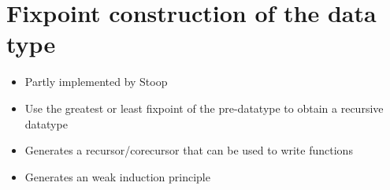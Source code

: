 \section{Fixpoint construction of the data type}

\begin{itemize}
\item{Partly implemented by Stoop~\cite{mrbnf_fixpoint}}
\item{Use the greatest or least fixpoint of the pre-datatype to obtain a recursive datatype}
\item{Generates a recursor/corecursor that can be used to write functions}
\item{Generates an weak induction principle}
\end{itemize}
